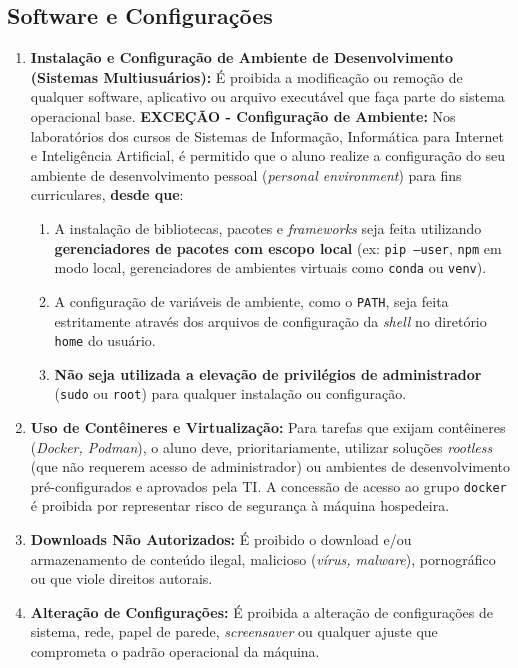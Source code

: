 \documentclass[12pt]{article}
\begin{document}
\subsection{Software e Configurações}
\begin{enumerate}
    \item \textbf{Instalação e Configuração de Ambiente de Desenvolvimento (Sistemas Multiusuários):} É proibida a modificação ou remoção de qualquer software, aplicativo ou arquivo executável que faça parte do sistema operacional base. \textbf{EXCEÇÃO - Configuração de Ambiente:} Nos laboratórios dos cursos de Sistemas de Informação, Informática para Internet e Inteligência Artificial, é permitido que o aluno realize a configuração do seu ambiente de desenvolvimento pessoal (\emph{personal environment}) para fins curriculares, \textbf{desde que}:
    \begin{enumerate}
        \item A instalação de bibliotecas, pacotes e \emph{frameworks} seja feita utilizando \textbf{gerenciadores de pacotes com escopo local} (ex: \texttt{pip --user}, \texttt{npm} em modo local, gerenciadores de ambientes virtuais como \texttt{conda} ou \texttt{venv}).
        \item A configuração de variáveis de ambiente, como o \texttt{PATH}, seja feita estritamente através dos arquivos de configuração da \emph{shell} no diretório \texttt{home} do usuário.
        \item \textbf{Não seja utilizada a elevação de privilégios de administrador} (\texttt{sudo} ou \texttt{root}) para qualquer instalação ou configuração.
    \end{enumerate}
    
    \item \textbf{Uso de Contêineres e Virtualização:} Para tarefas que exijam contêineres (\emph{Docker, Podman}), o aluno deve, prioritariamente, utilizar soluções \emph{rootless} (que não requerem acesso de administrador) ou ambientes de desenvolvimento pré-configurados e aprovados pela TI. A concessão de acesso ao grupo \texttt{docker} é proibida por representar risco de segurança à máquina hospedeira.
    
    \item \textbf{Downloads Não Autorizados:} É proibido o download e/ou armazenamento de conteúdo ilegal, malicioso (\emph{vírus, malware}), pornográfico ou que viole direitos autorais.
    \item \textbf{Alteração de Configurações:} É proibida a alteração de configurações de sistema, rede, papel de parede, \emph{screensaver} ou qualquer ajuste que comprometa o padrão operacional da máquina.
\end{enumerate}
\end{document}
